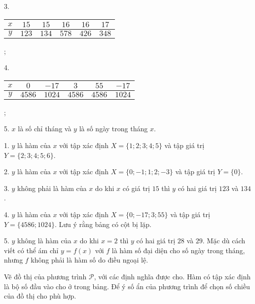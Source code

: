3.
\begin{tabular}{|c|c|c|c|c|c|}
   \hline
   $x$ & $15$ & $15$ & $16$ & $16$ & $17$ \\
   \hline
   $y$ & $123$ & $134$ & $578$ & $426$ & $348$ \\
   \hline
\end{tabular};

4.
\begin{tabular}{|c|c|c|c|c|c|}
   \hline
   $x$ & $0$ & $-17$ & $3$ & $55$ & $-17$ \\
   \hline
   $y$ & $4586$ & $1024$ & $4586$ & $4586$ & $1024$ \\
   \hline
\end{tabular};

5. $x$ là số chỉ tháng và $y$ là số ngày trong tháng $x$.

\solution

1. $y$ là hàm của $x$ với tập xác định $X = \{1; 2; 3; 4; 5\}$ và tập giá trị $Y = \{2; 3; 4; 5; 6\}$.

2. $y$ là hàm của $x$ với tập xác định $X = \{0; -1; 1; 2; -3\}$ và tập giá trị $Y = \{0\}$.

3. $y$ không phải là hàm của $x$ do khi $x$ có giá trị $15$ thì $y$ có hai giá trị $123$ và $134$.

4. $y$ là hàm của $x$ với tập xác định $X = \{0; -17; 3; 55\}$ và tập giá trị $Y = \{4586; 1024\}$. Lưu ý rằng bảng có cột bị lặp.

5. $y$ không là hàm của $x$ do khi $x = 2$ thì $y$ có hai giá trị $28$ và $29$. Mặc dù cách viết có thể ám chỉ $y=f(x)$ với $f$ là hàm số đại diện cho số ngày trong tháng, nhưng $f$ không phải là hàm số do điều ngoại lệ.

 Vẽ đồ thị của phương trình $\mathcal{P}$, với các định nghĩa được cho. Hàm có tập xác định là bộ số đầu vào cho ở trong bảng. Để ý số ẩn của phương trình để chọn số chiều của đồ thị cho phù hợp.

